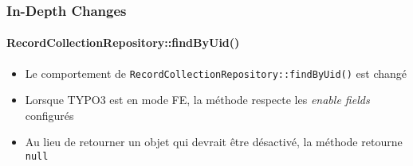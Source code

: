
\begin{frame}[fragile]
	\frametitle{In-Depth Changes}
	\framesubtitle{RecordCollectionRepository::findByUid()}

	\begin{itemize}
		\item Le comportement de \texttt{RecordCollectionRepository::findByUid()} est changé
		\item Lorsque TYPO3 est en mode FE, la méthode respecte les \textit{enable fields} configurés
		\item Au lieu de retourner un objet qui devrait être désactivé, la méthode retourne \texttt{null}

	\end{itemize}

\end{frame}

